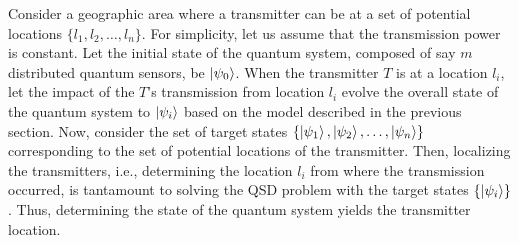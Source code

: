 

Consider a geographic area where a transmitter can be at a set of potential locations $\{l_1, l_2, \ldots, l_n\}$. 
For simplicity, let us assume that the transmission power is constant.
Let the initial state of the quantum system, composed of say $m$ distributed quantum sensors,
be $\ket{\psi_0}$. 
When the transmitter $T$ is at a location $l_i$, let the impact of the $T$'s transmission from location $l_i$ evolve the overall state of the quantum system to $\ket{\psi_i}$ 
based on the model described in the previous section.
Now, consider the set of target states $\{\ket{\psi_1}, \ket{\psi_2}, \ldots, \ket{\psi_n}\}$ corresponding to the set of potential locations of the transmitter. Then, localizing the transmitters, i.e., determining the location $l_i$ from where the transmission occurred, is
tantamount to solving the QSD problem with the target states $\{\ket{\psi_i}\}$.
Thus, determining the state of the quantum system yields the transmitter location.

